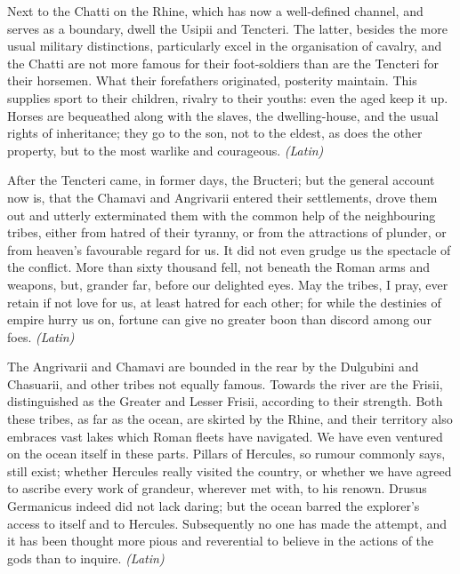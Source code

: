 
Next to the Chatti on the Rhine, which has now a well-defined channel, and serves as a boundary, dwell the Usipii and Tencteri. The latter, besides the more usual military distinctions, particularly excel in the organisation of cavalry, and the Chatti are not more famous for their foot-soldiers than are the Tencteri for their horsemen. What their forefathers originated, posterity maintain. This supplies sport to their children, rivalry to their youths: even the aged keep it up. Horses are bequeathed along with the slaves, the dwelling-house, and the usual rights of inheritance; they go to the son, not to the eldest, as does the other property, but to the most warlike and courageous. \emph{(Latin)}


After the Tencteri came, in former days, the Bructeri; but the general account now is, that the Chamavi and Angrivarii entered their settlements, drove them out and utterly exterminated them with the common help of the neighbouring tribes, either from hatred of their tyranny, or from the attractions of plunder, or from heaven's favourable regard for us. It did not even grudge us the spectacle of the conflict. More than sixty thousand fell, not beneath the Roman arms and weapons, but, grander far, before our delighted eyes. May the tribes, I pray, ever retain if not love for us, at least hatred for each other; for while the destinies of empire hurry us on, fortune can give no greater boon than discord among our foes. \emph{(Latin)}


The Angrivarii and Chamavi are bounded in the rear by the Dulgubini and Chasuarii, and other tribes not equally famous. Towards the river are the Frisii, distinguished as the Greater and Lesser Frisii, according to their strength. Both these tribes, as far as the ocean, are skirted by the Rhine, and their territory also embraces vast lakes which Roman fleets have navigated. We have even ventured on the ocean itself in these parts. Pillars of Hercules, so rumour commonly says, still exist; whether Hercules really visited the country, or whether we have agreed to ascribe every work of grandeur, wherever met with, to his renown. Drusus Germanicus indeed did not lack daring; but the ocean barred the explorer's access to itself and to Hercules. Subsequently no one has made the attempt, and it has been thought more pious and reverential to believe in the actions of the gods than to inquire. \emph{(Latin)}

